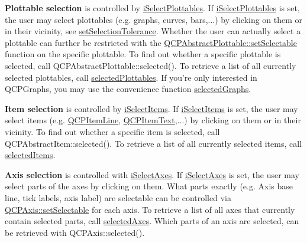 {\bfseries Plottable selection} is controlled by \hyperlink{classQCustomPlot_acc82d021129b61e550e36747d2e76d3aacf8f7cf0b21c32a85d3a72ccd48f0313}{i\-Select\-Plottables}. If \hyperlink{classQCustomPlot_acc82d021129b61e550e36747d2e76d3aacf8f7cf0b21c32a85d3a72ccd48f0313}{i\-Select\-Plottables} is set, the user may select plottables (e.\-g. graphs, curves, bars,...) by clicking on them or in their vicinity, see \hyperlink{classQCustomPlot_a4dc31241d7b09680950e19e5f971ed93}{set\-Selection\-Tolerance}. Whether the user can actually select a plottable can further be restricted with the \hyperlink{classQCPAbstractPlottable_a22c69299eb5569e0f6bf084877a37dc4}{Q\-C\-P\-Abstract\-Plottable\-::set\-Selectable} function on the specific plottable. To find out whether a specific plottable is selected, call Q\-C\-P\-Abstract\-Plottable\-::selected(). To retrieve a list of all currently selected plottables, call \hyperlink{classQCustomPlot_a6721b8c689bb7f2f400987e580508fe8}{selected\-Plottables}. If you're only interested in Q\-C\-P\-Graphs, you may use the convenience function \hyperlink{classQCustomPlot_ad2a0493bdd01e7aa99a4209ae3a5b67b}{selected\-Graphs}.

{\bfseries Item selection} is controlled by \hyperlink{classQCustomPlot_acc82d021129b61e550e36747d2e76d3aa2f1c34708a97bc30cc14684fa6cb844d}{i\-Select\-Items}. If \hyperlink{classQCustomPlot_acc82d021129b61e550e36747d2e76d3aa2f1c34708a97bc30cc14684fa6cb844d}{i\-Select\-Items} is set, the user may select items (e.\-g. \hyperlink{classQCPItemLine}{Q\-C\-P\-Item\-Line}, \hyperlink{classQCPItemText}{Q\-C\-P\-Item\-Text},...) by clicking on them or in their vicinity. To find out whether a specific item is selected, call Q\-C\-P\-Abstract\-Item\-::selected(). To retrieve a list of all currently selected items, call \hyperlink{classQCustomPlot_a1a48b13547e2d9ac5cd6927516f47a2e}{selected\-Items}.

{\bfseries Axis selection} is controlled with \hyperlink{classQCustomPlot_acc82d021129b61e550e36747d2e76d3aa2deb166692b109ab125cb2d2a5e24150}{i\-Select\-Axes}. If \hyperlink{classQCustomPlot_acc82d021129b61e550e36747d2e76d3aa2deb166692b109ab125cb2d2a5e24150}{i\-Select\-Axes} is set, the user may select parts of the axes by clicking on them. What parts exactly (e.\-g. Axis base line, tick labels, axis label) are selectable can be controlled via \hyperlink{classQCPAxis_afa988209bf6519f63d6ef2e615dbe1ea}{Q\-C\-P\-Axis\-::set\-Selectable} for each axis. To retrieve a list of all axes that currently contain selected parts, call \hyperlink{classQCustomPlot_aa6baf867e8beb96ed5bd471f83ece903}{selected\-Axes}. Which parts of an axis are selected, can be retrieved with Q\-C\-P\-Axis\-::selected().

